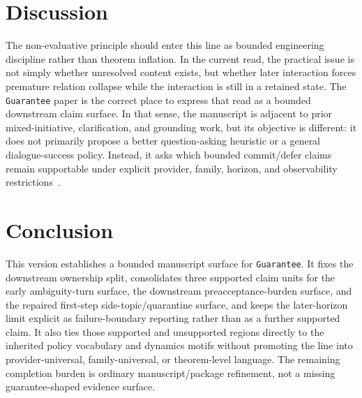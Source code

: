 \documentclass[11pt]{article}
\begin{document}
\section{Discussion}

The non-evaluative principle should enter this line as bounded engineering
discipline rather than theorem inflation. In the current read, the practical issue
is not simply whether unresolved content exists, but whether later interaction
forces premature relation collapse while the interaction is still in a retained
state. The \texttt{Guarantee} paper is the correct place to express that read as
a bounded downstream claim surface. In that sense, the manuscript is adjacent to
prior mixed-initiative, clarification, and grounding work, but its objective is
different: it does not primarily propose a better question-asking heuristic or a
general dialogue-success policy. Instead, it asks which bounded commit/defer
claims remain supportable under explicit provider, family, horizon, and
observability restrictions~\cite{saito2000mimic,saito2003clarification,saito2018evpi,saito2021grounding}.

\section{Conclusion}

This version establishes a bounded manuscript surface for \texttt{Guarantee}.
It fixes the downstream ownership split, consolidates three
supported claim units for the early ambiguity-turn surface, the downstream
preacceptance-burden surface, and the repaired first-step side-topic/quarantine
surface, and keeps the later-horizon limit explicit as failure-boundary
reporting rather than as a further supported claim. It also ties those
supported and unsupported regions directly to the inherited policy vocabulary
and dynamics motifs without promoting the line into provider-universal,
family-universal, or theorem-level language. The remaining completion burden is
ordinary manuscript/package refinement, not a missing guarantee-shaped evidence
surface.
\end{document}

